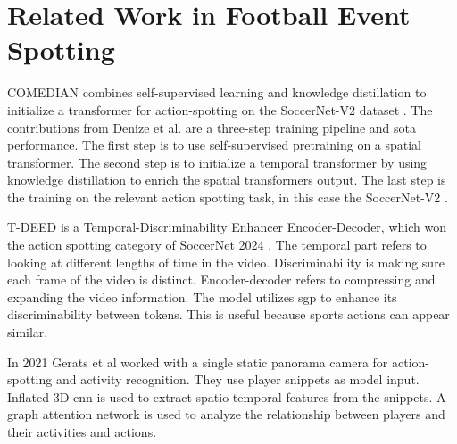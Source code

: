 \section{Related Work in Football Event Spotting}
\label{sec:fw_work}

COMEDIAN \cite{denize_comedian_2024} combines self-supervised learning and knowledge distillation to initialize a transformer for action-spotting on the SoccerNet-V2 dataset \cite{deliege_soccernet-v2_dataset_2021}. The contributions from Denize et al. are a three-step training pipeline and \acrshort{sota} performance. The first step is to use self-supervised pretraining on a spatial transformer. The second step is to initialize a temporal transformer by using knowledge distillation to enrich the spatial transformers output. The last step is the training on the relevant action spotting task, in this case the SoccerNet-V2 \cite{deliege_soccernet-v2_dataset_2021}.

T-DEED \cite{xarles_t-deed_2024} is a Temporal-Discriminability Enhancer Encoder-Decoder, which won the action spotting category of SoccerNet 2024 \cite{cioppa_soccernet_2024}. The temporal part refers to looking at different lengths of time in the video. Discriminability is making sure each frame of the video is distinct. Encoder-decoder refers to compressing and expanding the video information. The model utilizes \acrfull{sgp} to enhance its discriminability between tokens. This is useful because sports actions can appear similar. 

In 2021 Gerats et al\cite{gerats_individual_same_task_2021} worked with a single static panorama camera for action-spotting and activity recognition. They use player snippets as model input. Inflated 3D \acrshort{cnn} is used to extract spatio-temporal features from the snippets. A graph attention network is used to analyze the relationship between players and their activities and actions.




